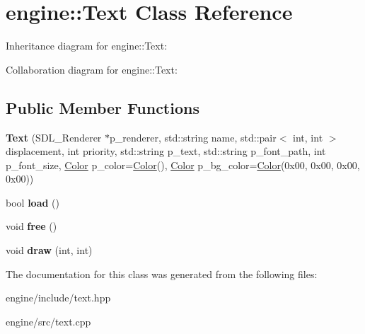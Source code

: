 \hypertarget{classengine_1_1_text}{}\section{engine\+:\+:Text Class Reference}
\label{classengine_1_1_text}


Inheritance diagram for engine\+:\+:Text\+:


Collaboration diagram for engine\+:\+:Text\+:
\subsection*{Public Member Functions}
\begin{DoxyCompactItemize}
\item 
{\bfseries Text} (S\+D\+L\+\_\+\+Renderer $\ast$p\+\_\+renderer, std\+::string name, std\+::pair$<$ int, int $>$ displacement, int priority, std\+::string p\+\_\+text, std\+::string p\+\_\+font\+\_\+path, int p\+\_\+font\+\_\+size, \hyperlink{structengine_1_1_color}{Color} p\+\_\+color=\hyperlink{structengine_1_1_color}{Color}(), \hyperlink{structengine_1_1_color}{Color} p\+\_\+bg\+\_\+color=\hyperlink{structengine_1_1_color}{Color}(0x00, 0x00, 0x00, 0x00))\hypertarget{classengine_1_1_text_a425360c835a5b98475a830d6d561e5ed}{}\label{classengine_1_1_text_a425360c835a5b98475a830d6d561e5ed}

\item 
bool {\bfseries load} ()\hypertarget{classengine_1_1_text_a88ce89de3c78db0d163a7496261edc2d}{}\label{classengine_1_1_text_a88ce89de3c78db0d163a7496261edc2d}

\item 
void {\bfseries free} ()\hypertarget{classengine_1_1_text_af6e2ba3f1cf543997b12dcc5ad5041c2}{}\label{classengine_1_1_text_af6e2ba3f1cf543997b12dcc5ad5041c2}

\item 
void {\bfseries draw} (int, int)\hypertarget{classengine_1_1_text_aab42d46b709807d21ba73a4c59c18408}{}\label{classengine_1_1_text_aab42d46b709807d21ba73a4c59c18408}

\end{DoxyCompactItemize}


The documentation for this class was generated from the following files\+:\begin{DoxyCompactItemize}
\item 
engine/include/text.\+hpp\item 
engine/src/text.\+cpp\end{DoxyCompactItemize}

